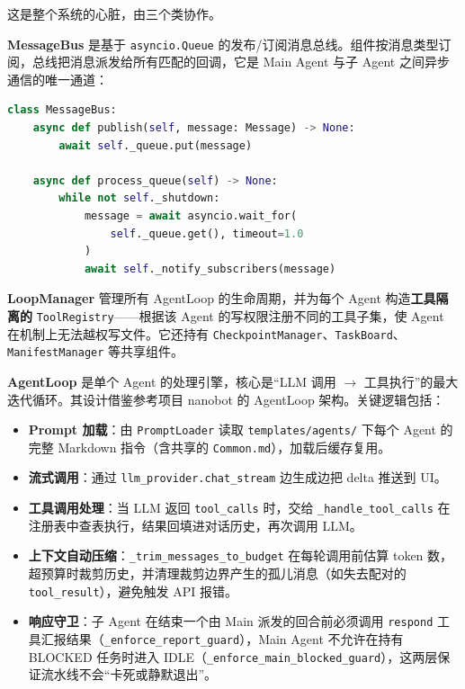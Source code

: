 \documentclass[a4paper,11pt]{article}
\begin{document}
这是整个系统的心脏，由三个类协作。

\textbf{MessageBus} 是基于 \texttt{asyncio.Queue} 的发布/订阅消息总线。组件按消息类型订阅，总线把消息派发给所有匹配的回调，它是 Main Agent 与子 Agent 之间异步通信的唯一通道：

\begin{lstlisting}[language=Python]
class MessageBus:
    async def publish(self, message: Message) -> None:
        await self._queue.put(message)

    async def process_queue(self) -> None:
        while not self._shutdown:
            message = await asyncio.wait_for(
                self._queue.get(), timeout=1.0
            )
            await self._notify_subscribers(message)
\end{lstlisting}

\textbf{LoopManager} 管理所有 AgentLoop 的生命周期，并为每个 Agent 构造\textbf{工具隔离的} \texttt{ToolRegistry}——根据该 Agent 的写权限注册不同的工具子集，使 Agent 在机制上无法越权写文件。它还持有 \texttt{CheckpointManager}、\texttt{TaskBoard}、\texttt{ManifestManager} 等共享组件。

\textbf{AgentLoop} 是单个 Agent 的处理引擎，核心是“LLM 调用 $\rightarrow$ 工具执行”的最大迭代循环。其设计借鉴参考项目 nanobot\cite{nanobot} 的 AgentLoop 架构。关键逻辑包括：

\begin{itemize}[leftmargin=1.4em,itemsep=2pt]
  \item \textbf{Prompt 加载}：由 \texttt{PromptLoader} 读取 \texttt{templates/agents/} 下每个 Agent 的完整 Markdown 指令（含共享的 \texttt{Common.md}），加载后缓存复用。
  \item \textbf{流式调用}：通过 \texttt{llm\_provider.chat\_stream} 边生成边把 delta 推送到 UI。
  \item \textbf{工具调用处理}：当 LLM 返回 \texttt{tool\_calls} 时，交给 \texttt{\_handle\_tool\_calls} 在注册表中查表执行，结果回填进对话历史，再次调用 LLM。
  \item \textbf{上下文自动压缩}：\texttt{\_trim\_messages\_to\_budget} 在每轮调用前估算 token 数，超预算时裁剪历史，并清理裁剪边界产生的孤儿消息（如失去配对的 \texttt{tool\_result}），避免触发 API 报错。
  \item \textbf{响应守卫}：子 Agent 在结束一个由 Main 派发的回合前必须调用 \texttt{respond} 工具汇报结果（\texttt{\_enforce\_report\_guard}），Main Agent 不允许在持有 BLOCKED 任务时进入 IDLE（\texttt{\_enforce\_main\_blocked\_guard}），这两层保证流水线不会“卡死或静默退出”。
\end{itemize}
\end{document}

